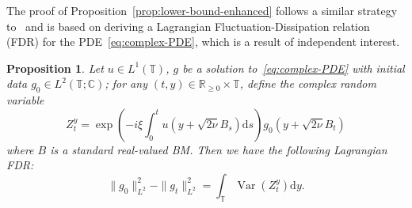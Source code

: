 \documentclass[11pt,oneside,reqno]{amsart}
\newcommand{\mathd}{\mathrm{d}}
\newcommand{\tmop}[1]{\ensuremath{\operatorname{#1}}}
\newtheorem{proposition}[theorem]{Proposition}
{\theoremstyle{remark}\newtheorem{remark}[theorem]{Remark}}
\numberwithin{equation}{section}
\begin{document}
The proof of Proposition~\ref{prop:lower-bound-enhanced} follows a similar
strategy to~{\cite{zelatidrivas}} and is based on deriving a Lagrangian
Fluctuation-Dissipation relation (FDR) for the PDE~\eqref{eq:complex-PDE},
which is a result of independent interest.

\begin{proposition}
  \label{prop:FDR}Let $u \in L^1 (\mathbb{T})$, $g$ be a solution
  to~\eqref{eq:complex-PDE} with initial data $g_0 \in L^2 (\mathbb{T};
  \mathbb{C})$; for any $(t, y) \in \mathbb{R}_{\geqslant 0} \times
  \mathbb{T}$, define the complex random variable
  \[ Z^y_t = \exp \left( - i \xi \int_0^t u \left( y + \sqrt{2 \nu} B_s
     \right) \mathd s \right) g_0 \left( y + \sqrt{2 \nu} B_t \right) \]
  where $B$ is a standard real-valued BM. Then we have the following
  Lagrangian FDR:
  \begin{equation}
    \| g_0 \|_{L^2}^2 - \| g_t \|_{L^2}^2 = \int_{\mathbb{T}} \tmop{Var}
    (Z^y_t) \mathd y. \label{eq:FDR}
  \end{equation}
\end{proposition}
\end{document}
